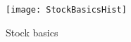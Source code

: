 
\begin{figure}[h]
  \texttt{[image: StockBasicsHist]}
  \caption{Stock basics}
  \label{fig:stock_basics}
\end{figure}

